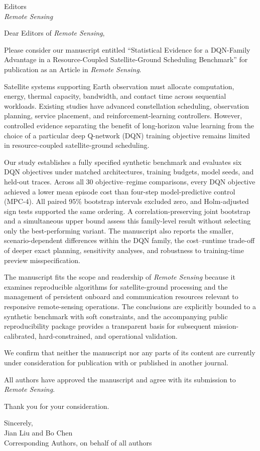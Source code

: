 \documentclass[11pt]{letter}
\date{31 August 2026}
\begin{document}
\begin{letter}{Editors\\
\emph{Remote Sensing}}

\opening{Dear Editors of \emph{Remote Sensing},}

Please consider our manuscript entitled ``Statistical Evidence for a DQN-Family Advantage in a Resource-Coupled Satellite-Ground Scheduling Benchmark'' for publication as an Article in \emph{Remote Sensing}.

Satellite systems supporting Earth observation must allocate computation, energy, thermal capacity, bandwidth, and contact time across sequential workloads. Existing studies have advanced constellation scheduling, observation planning, service placement, and reinforcement-learning controllers. However, controlled evidence separating the benefit of long-horizon value learning from the choice of a particular deep Q-network (DQN) training objective remains limited in resource-coupled satellite-ground scheduling.

Our study establishes a fully specified synthetic benchmark and evaluates six DQN objectives under matched architectures, training budgets, model seeds, and held-out traces. Across all 30 objective--regime comparisons, every DQN objective achieved a lower mean episode cost than four-step model-predictive control (MPC-4). All paired 95\% bootstrap intervals excluded zero, and Holm-adjusted sign tests supported the same ordering. A correlation-preserving joint bootstrap and a simultaneous upper bound assess this family-level result without selecting only the best-performing variant. The manuscript also reports the smaller, scenario-dependent differences within the DQN family, the cost--runtime trade-off of deeper exact planning, sensitivity analyses, and robustness to training-time preview misspecification.

The manuscript fits the scope and readership of \emph{Remote Sensing} because it examines reproducible algorithms for satellite-ground processing and the management of persistent onboard and communication resources relevant to responsive remote-sensing operations. The conclusions are explicitly bounded to a synthetic benchmark with soft constraints, and the accompanying public reproducibility package provides a transparent basis for subsequent mission-calibrated, hard-constrained, and operational validation.

We confirm that neither the manuscript nor any parts of its content are currently under consideration for publication with or published in another journal.

All authors have approved the manuscript and agree with its submission to \emph{Remote Sensing}.

Thank you for your consideration.

\vspace{0.8em}
Sincerely,\\[1em]
Jian Liu and Bo Chen\\
Corresponding Authors, on behalf of all authors

\end{letter}
\end{document}
